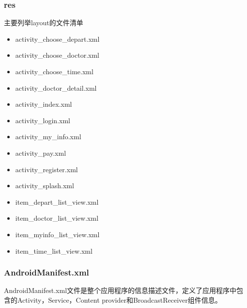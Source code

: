 \documentclass[UTF8,12pt]{article}
\begin{document}
\subsubsection{res}
主要列举layout的文件清单
\begin{itemize}
    \item activity\_choose\_depart.xml
    \item activity\_choose\_doctor.xml
    \item activity\_choose\_time.xml
    \item activity\_doctor\_detail.xml
    \item activity\_index.xml
    \item activity\_login.xml
    \item activity\_my\_info.xml
    \item activity\_pay.xml
    \item activity\_register.xml
    \item activity\_splash.xml
    \item item\_depart\_list\_view.xml
    \item item\_doctor\_list\_view.xml
    \item item\_myinfo\_list\_view.xml
    \item item\_time\_list\_view.xml
\end{itemize}

\subsubsection{AndroidManifest.xml}
AndroidManifest.xml文件是整个应用程序的信息描述文件，定义了应用程序中包含的Activity，Service，Content provider和BroadcastReceiver组件信息。
\end{document}
